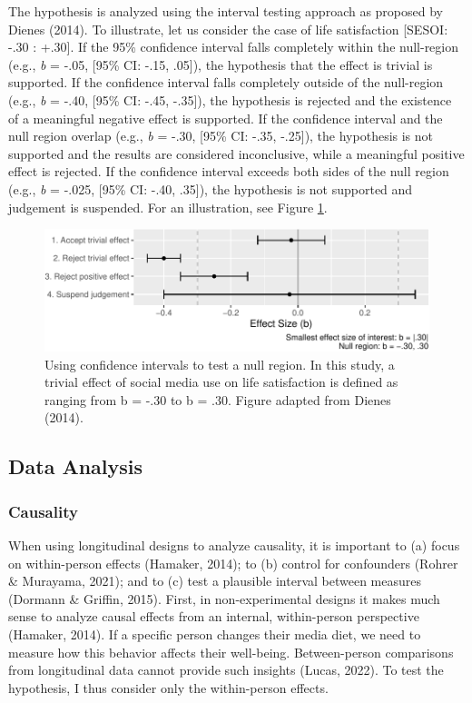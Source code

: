 \documentclass[
  man,mask,floatsintext]{apa7}
\begin{document}
The hypothesis is analyzed using the interval testing approach as proposed by Dienes (2014).
To illustrate, let us consider the case of life satisfaction {[}SESOI: -.30 : +.30{]}.
If the 95\% confidence interval falls completely within the null-region (e.g., \emph{b} = -.05, {[}95\% CI: -.15, .05{]}), the hypothesis that the effect is trivial is supported.
If the confidence interval falls completely outside of the null-region (e.g., \emph{b} = -.40, {[}95\% CI: -.45, -.35{]}), the hypothesis is rejected and the existence of a meaningful negative effect is supported.
If the confidence interval and the null region overlap (e.g., \emph{b} = -.30, {[}95\% CI: -.35, -.25{]}), the hypothesis is not supported and the results are considered inconclusive, while a meaningful positive effect is rejected.
If the confidence interval exceeds both sides of the null region (e.g., \emph{b} = -.025, {[}95\% CI: -.40, .35{]}), the hypothesis is not supported and judgement is suspended.
For an illustration, see Figure \ref{fig:sesoi}.

\begin{figure}
\centering
\includegraphics{manuscript_files/figure-latex/sesoi-1.pdf}
\caption{\label{fig:sesoi}Using confidence intervals to test a null region. In this study, a trivial effect of social media use on life satisfaction is defined as ranging from b = -.30 to b = .30. Figure adapted from Dienes (2014).}
\end{figure}

\hypertarget{data-analysis}{%
\subsection{Data Analysis}\label{data-analysis}}

\hypertarget{causality}{%
\subsubsection{Causality}\label{causality}}

When using longitudinal designs to analyze causality, it is important to (a) focus on within-person effects (Hamaker, 2014); to (b) control for confounders (Rohrer \& Murayama, 2021); and to (c) test a plausible interval between measures (Dormann \& Griffin, 2015).
First, in non-experimental designs it makes much sense to analyze causal effects from an internal, within-person perspective (Hamaker, 2014).
If a specific person changes their media diet, we need to measure how this behavior affects their well-being.
Between-person comparisons from longitudinal data cannot provide such insights (Lucas, 2022).
To test the hypothesis, I thus consider only the within-person effects.
\end{document}
